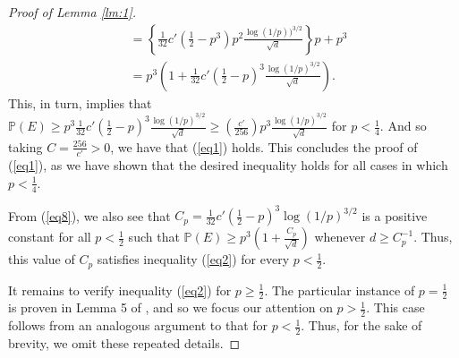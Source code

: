 \documentclass{article}
\begin{document}
\begin{proof}[Proof of Lemma \ref{lm:1}]
\begin{align}
&= \left\{ \frac{1}{32} c'\left( \frac{1}{2} - p^3 \right)p^2 \frac{\log(1/p))^{3/2}}{\sqrt{d}} \right\}p + p^3 \nonumber\\
&= p^3 \left(1 + \frac{1}{32}c' \left(\frac{1}{2} - p \right)^3 \frac{\log(1/p)^{3/2}}{\sqrt{d}} \right)\label{eq8}.
\end{align}
This, in turn, implies that $\mathbb{P}(E) \geq p^3\frac{1}{32}c' \left(\frac{1}{2} - p \right)^3 \frac{\log(1/p)^{3/2}}{\sqrt{d}} \geq \left(\frac{c'}{256} \right)p^3 \frac{\log(1/p)^{3/2}}{\sqrt{d}}$ for $p < \frac{1}{4}$. And so taking $C = \frac{256}{c'} > 0$, we have that (\ref{eq1}) holds. This concludes the proof of (\ref{eq1}), as we have shown that the desired inequality holds for all cases in which $p < \frac{1}{4}$.

From (\ref{eq8}), we also see that $C_p = \frac{1}{32}c'(\frac{1}{2} - p)^3\log(1/p)^{3/2}$ is a positive constant for all $p < \frac{1}{2}$ such that $\mathbb{P}(E) \geq p^3 \left( 1 + \frac{C_p}{\sqrt{d}} \right)$ whenever $d \geq C_p^{-1}$. Thus, this value of $C_p$ satisfies inequality (\ref{eq2}) for every $p < \frac{1}{2}$.

It remains to verify inequality (\ref{eq2}) for $p \geq \frac{1}{2}$. The particular instance of $p = \frac{1}{2}$ is proven in Lemma 5 of \cite{bubeck2016testing}, and so we focus our attention on $p > \frac{1}{2}$. This case follows from an analogous argument to that for $p < \frac{1}{2}$. Thus, for the sake of brevity, we omit these repeated details.


\end{proof}
\end{document}
